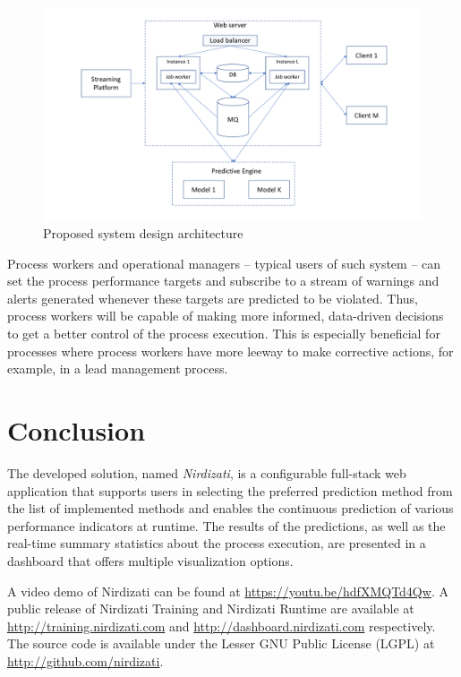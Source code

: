 \documentclass[runningheads,a4paper]{llncs}
\begin{document}
\begin{figure}
	\centering
	\includegraphics[width=1\textwidth]{img/nirdizati-runtime}
	\caption{Proposed system design architecture}
	\label{fig:nirdizati-runtime}
\end{figure}

Process workers and operational managers – typical users of such system – can set the process performance targets and subscribe to a stream of warnings and alerts generated whenever these targets are predicted to be violated. Thus, process workers will be capable of making more informed, data-driven decisions to get a better control of the process execution. This is especially beneficial for processes where process workers have more leeway to make corrective actions, for example, in a lead management process.

\section{Conclusion} \label{sec:conclusion}
The developed solution, named \emph{Nirdizati}, is a configurable full-stack web application that supports users in selecting the preferred prediction method from the list of implemented methods and enables the continuous prediction of various performance indicators at runtime.
The results of the predictions, as well as the real-time summary statistics about the process execution, are presented in a dashboard that offers multiple visualization options.

A video demo of Nirdizati can be found at \url{https://youtu.be/hdfXMQTd4Qw}. A public release of Nirdizati Training and Nirdizati Runtime are available at \url{http://training.nirdizati.com} and \url{http://dashboard.nirdizati.com} respectively. The source code is available under the Lesser GNU Public License (LGPL) at \url{http://github.com/nirdizati}. 


\end{document}
